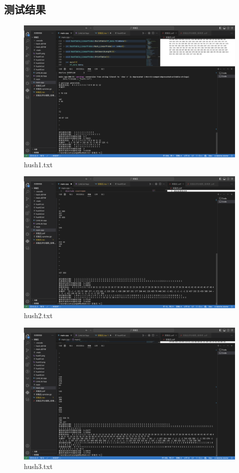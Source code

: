 \documentclass[UTF8]{ctexart}
\begin{document}
\subsection{测试结果}
\begin{figure}[H]
  \centering
  \includegraphics[scale=0.25]{hush1.png}
  \caption{hush1.txt}
\end{figure}
\begin{figure}[H]
  \centering
  \includegraphics[scale=0.25]{hush2.png}
  \caption{hush2.txt}
\end{figure}
\begin{figure}[H]
  \centering
  \includegraphics[scale=0.25]{hush3.png}
  \caption{hush3.txt}
\end{figure}
\end{document}
